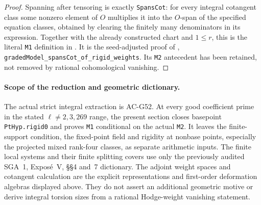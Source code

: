 \begin{proof}
Spanning after tensoring is exactly
\texttt{SpansCot}: for every integral cotangent
class some nonzero element of $O$ multiplies it
into the $O$-span of the specified equation
classes, obtained by clearing the finitely many
denominators in its expression.
Together with the already constructed chart and
$1\leq r$, this is the literal \texttt{M1}
definition in
.
It is the seed-adjusted proof of
,
\texttt{gradedModel\_spansCot\_of\_rigid\_weights}.
Its \texttt{M2} antecedent has been retained, not
removed by rational cohomological vanishing.
\end{proof}

\paragraph{Scope of the reduction and geometric dictionary.}
The actual strict integral extraction is AC-G52.
At every good coefficient prime in the stated
$\ell\ne2,3,269$ range, the present section closes basepoint
\texttt{PtHyp.rigid0} and proves \texttt{M1} conditional
on the actual \texttt{M2}.  It leaves the finite-support
condition, the fixed-point field and rigidity at
nonbase points, especially the projected mixed
rank-four classes, as separate arithmetic inputs.
The finite local systems and their finite splitting
covers use only the previously audited SGA~1,
Expos\'e~V, \S\S4 and~7 dictionary.
The adjoint weight spaces and cotangent calculation
are the explicit representations and first-order
deformation algebras displayed above.  They do not
assert an additional geometric motive or derive
integral torsion sizes from a rational Hodge-weight
vanishing statement.
